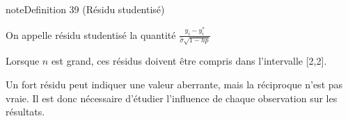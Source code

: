 \documentclass[letterpaper,10pt,french]{sphinxmanual}
\begin{document}
\ignorespaces \label{regression:definition-8}
\begin{sphinxadmonition}{note}{Definition 39 (Résidu studentisé)}



\sphinxAtStartPar
On appelle résidu studentisé la quantité \(\frac{y_i-y^*_i}{\hat{\sigma}\sqrt{1-hp}}\)
\end{sphinxadmonition}

\sphinxAtStartPar
Lorsque \(n\) est grand, ces résidus doivent être compris dans l’intervalle {[}\sphinxhyphen{}2,2{]}.

\sphinxAtStartPar
Un fort résidu peut indiquer une valeur aberrante, mais la réciproque n’est pas vraie. Il est donc nécessaire d’étudier l’influence de chaque observation sur les résultats.
\end{document}
